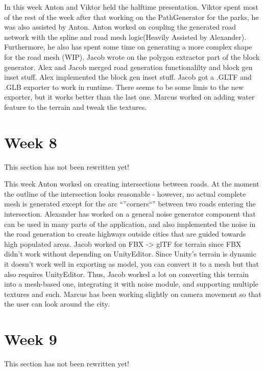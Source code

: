 \documentclass[11pt]{article}
\begin{document}
In this week Anton and Viktor held the halftime presentation. Viktor spent most
of the rest of the week after that working on the PathGenerator for the parks,
he was also assisted by Anton. Anton worked on coupling the generated road
network with the spline and road mesh logic(Heavily Assisted by Alexander).
Furthermore, he also has spent some time on generating a more complex shape for
the road mesh (WIP). Jacob wrote on the polygon extractor part of the block
generator. Alex and Jacob merged road generation functionalilty and block gen
inset stuff. Alex implemented the block gen inset stuff. Jacob got a .GLTF and
.GLB exporter to work in runtime. There seems to be some limis to the new
exporter, but it works better than the last one. Marcus worked on adding water
feature to the terrain and tweak the textures.

\section*{Week 8}
\label{sec:orge44b28f}
\begin{notice-warning}
This section has not been rewritten yet!
\end{notice-warning}

This week Anton worked on creating intersections between roads. At the moment
the outline of the intersection looks reasonable - however, no actual complete
mesh is generated except for the arc ``''corners``'' between two roads entering the
intersection.
Alexander has worked on a general noise generator component that can be used in
many parts of the application, and also implemented the noise in the road
generation to create highways outside cities that are guided towards high
populated areas.
Jacob worked on FBX -> glTF for terrain since FBX didn't work without depending
on UnityEditor. Since Unity's terrain is dynamic it doesn't work well in
exporting as model, you can convert it to a mesh but that also requires
UnityEditor. Thus, Jacob worked a lot on converting this terrain into a
mesh-based one, integrating it with noise module, and supporting multiple
textures and such.
Marcus has been working slightly on camera movement so that the user can look
around the city.

\section*{Week 9}
\label{sec:orga7c35b7}
\begin{notice-warning}
This section has not been rewritten yet!
\end{notice-warning}
\end{document}
